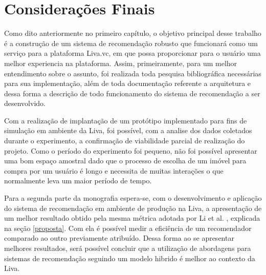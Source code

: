 \chapter{Considerações Finais}

Como dito anteriormente no primeiro capítulo, o objetivo principal desse trabalho é a construção de um sistema de recomendação robusto que funcionará como um serviço para a plataforma Liva.vc, em que possa proporcionar para o usuário uma melhor experiencia na plataforma. Assim, primeiramente, para um melhor entendimento sobre o assunto, foi realizada toda pesquisa bibliográfica necessárias para sua implementação, além de toda documentação referente a arquitetura e dessa forma a descrição de todo funcionamento do sistema de recomendação a ser desenvolvido.

Com a realização de implantação de um protótipo implementado para fins de simulação em ambiente da Liva, foi possível, com a analise dos dados coletados durante o experimento, a confirmação de viabilidade parcial de realização do projeto. Como o período do experimento foi pequeno, não foi possível apresentar uma bom espaço amostral dado que o processo de escolha de um imóvel para compra por um usuário é longo e necessita de muitas interações o que normalmente leva um maior período de tempo.

Para a segunda parte da monografia espera-se, com o desenvolvimento e aplicação do sistema de recomendação em ambiente de produção na Liva, a apresentação de um melhor resultado obtido pela mesma métrica adotada por Li et al. \citeyear{Summo:2017}, explicada na seção \ref{proposta}. Com ela é possível medir a eficiência de um recomendador comparado ao outro previamente atribuído. Dessa forma ao se apresentar melhores resultados, será possível concluir que a utilização de abordagens para sistemas de recomendação seguindo um modelo hibrido é melhor ao contexto da Liva.


